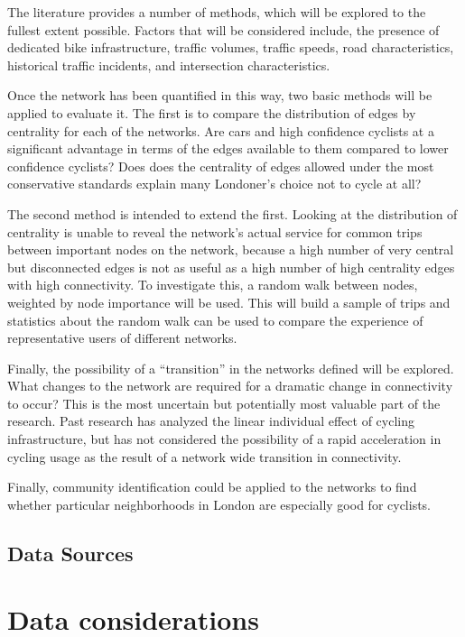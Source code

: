 \documentclass[11pt]{article} %
\begin{document}
The literature provides a number of methods, which will be explored to the fullest extent possible. Factors that will be considered include, the presence of dedicated bike infrastructure, traffic volumes, traffic speeds, road characteristics, historical traffic incidents, and intersection characteristics. 

Once the network has been quantified in this way, two basic methods will be applied to evaluate it. The first is to compare the distribution of edges by centrality for each of the networks. Are cars and high confidence cyclists at a significant advantage in terms of the edges available to them compared to lower confidence cyclists? Does does the centrality of edges allowed under the most conservative standards explain many Londoner's choice not to cycle at all? 

The second method is intended to extend the first. Looking at the distribution of centrality is unable to reveal the network's actual service for common trips between important nodes on the network, because a high number of very central but disconnected edges is not as useful as a high number of high centrality edges with high connectivity. To investigate this, a random walk between nodes, weighted by node importance will be used. This will build a sample of trips and statistics about the random walk can be used to compare the experience of representative users of different networks. 

Finally, the possibility of a ``transition'' in the networks defined will be explored. What changes to the network are required for a dramatic change in connectivity to occur? This is the most uncertain but potentially most valuable part of the research. Past research has analyzed the linear individual effect of cycling infrastructure, but has not considered the possibility of a rapid acceleration in cycling usage as the result of a network wide transition in connectivity. 

Finally, community identification could be applied to the networks to find whether particular neighborhoods in London are especially good for cyclists. 

 

\subsection{Data Sources}


\section{Data considerations}
\end{document}
